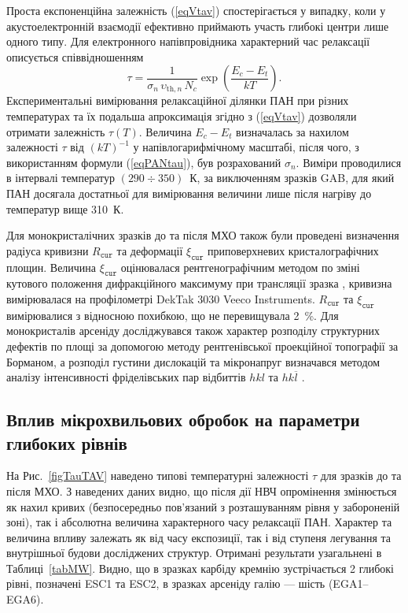 \documentclass[a4paper,14pt,oneside,openany]{memoir}
\begin{document}
Проста експоненційна залежність (\ref{eqVtav}) спостерігається у випадку, коли у акустоелектронній взаємодії ефективно приймають участь глибокі центри лише одного типу.
Для електронного напівпровідника характерний час релаксації описується співвідношенням \cite{Saiko1993,Rzanov,OstrovPAN}
\begin{equation}\label{eqPANtau}
  \tau=\frac{1}{\sigma_n\,\upsilon_{\mathrm{th},n}\,N_c}\exp\left(\frac{E_c-E_t}{kT}\right).
\end{equation}
Експериментальні вимірювання релаксаційної ділянки ПАН при різних температурах та їх подальша апроксимація згідно з (\ref{eqVtav}) дозволяли отримати
залежність $\tau(T)$.
Величина $E_c-E_t$ визначалась за нахилом залежності $\tau$ від $(kT)^{-1}$ у напівлогарифмічному масштабі, після чого, з використанням формули (\ref{eqPANtau}),
був розрахований $\sigma_n$.
Виміри проводилися в інтервалі температур $(290\div350)$~К,
за виключенням зразків GAB, для який ПАН досягала достатньої для вимірювання величини лише після нагріву до температур вище 310~К.

Для монокристалічних зразків до та після МХО також були проведені визначення радіуса кривизни $R_\mathtt{cur}$ та
деформації $\xi_\mathtt{cur}$ приповерхневих кристалографічних площин.
Величина $\xi_\mathtt{cur}$ оцінювалася рентгенографічним методом по зміні кутового положення дифракційного максимуму при трансляції зразка \cite{Godwod},
кривизна вимірювалася на профілометрі DekTak 3030 Veeco Instruments.
$R_\mathtt{cur}$ та $\xi_\mathtt{cur}$ вимірювалися  з відносною похибкою, що не перевищувала 2~\%.
Для монокристалів арсеніду досліджувався також характер розподілу структурних дефектів по площі за допомогою методу
рентгенівської проекційної топографії за Борманом,
а розподіл густини дислокацій та мікронапруг визначався методом аналізу інтенсивності фріделівських пар відбиттів $hkl$ та $hk\overline{l}$ \cite{ThoricBook}.


\subsection{Вплив мікрохвильових обробок на параметри глибоких рівнів}

На Рис.~\ref{figTauTAV} наведено типові температурні залежності $\tau$ для зразків до та після МХО.
З наведених даних видно, що після дії НВЧ опромінення змінюється як нахил кривих (безпосередньо пов'язаний
з розташуванням рівня у забороненій зоні), так і абсолютна величина характерного часу релаксації ПАН.
Характер та величина впливу залежать як від часу експозиції, так і від ступеня легування та внутрішньої будови
досліджених структур.
Отримані результати узагальнені в Таблиці~\ref{tabMW}.
Видно, що в зразках карбіду кремнію зустрічається 2 глибокі рівні, позначені ESC1 та ESC2,
в зразках арсеніду галію --- шість (EGA1--EGA6).
\end{document}
